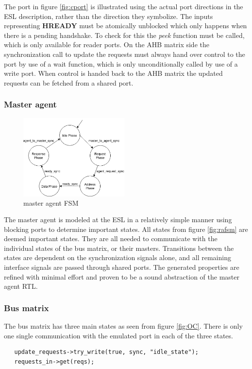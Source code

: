 The port in figure \ref{fig:cport} is illustrated using the actual port directions in the ESL description, rather than the direction they symbolize. The inputs representing \textbf{HREADY} must be atomically unblocked which only happens when there is a pending handshake. To check for this the \textit{peek} function must be called, which is only available for reader ports. On the AHB matrix side the synchronization call to update the requests must always hand over control to the port by use of a wait function, which is only unconditionally called by use of a write port. When control is handed back to the AHB matrix the updated requests can be fetched from a shared port. 

\subsubsection{Master agent}
\begin{figure}
\includegraphics[width=5.5cm]{figs/ESL/mAgent_ESL.png}
\caption{master agent FSM}\label{fig:eafsm}
\end{figure}
The master agent is modeled at the ESL in a relatively simple manner using blocking ports to determine important states. All states from figure \ref{fig:rafsm} are deemed important states. They are all needed to communicate with the individual states of the bus matrix, or their masters. Transitions between the states are dependent on the synchronization signals alone, and all remaining interface signals are passed through shared ports. The generated properties are refined with minimal effort and proven to be a sound abstraction of the master agent RTL.  \\
\newline  

\subsubsection{Bus matrix}
The bus matrix has three main states as seen from figure \ref{fig:OC}. There is only one single communication with the emulated port in each of the three states. 
\begin{lstlisting}
   update_requests->try_write(true, sync, "idle_state");
   requests_in->get(reqs);
\end{lstlisting}

